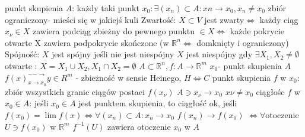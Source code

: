 \documentclass{article}
\begin{document}
punkt skupienia $A$: każdy taki punkt $x_0:\exists (x_n)\subset A:xn\rightarrow x_0, x_n\neq x_0$\newline
zbiór ograniczony- mieści się w jakiejś kuli\newline
Zwartość: $X\subset V$ jest zwarty$\Leftrightarrow$ każdy ciąg $x_\nu\in X$ zawiera podciąg zbieżny do pewnego punktu $\in X
\Leftrightarrow$ każde pokrycie otwarte X zawiera podpokrycie skończone (w $\mathbb{R}^n\Leftrightarrow$ domknięty i ograniczony)\newline
Spójność: $X$ jest spójny jeśli nie jest niespójny\newline
$X$ jest niespójny gdy $\exists X_1, X_2\neq\emptyset$ otwarte : $X=X_1\cup X_2,X_1\cap X_2=\emptyset$\newline
$A\subset \mathbb{R}^n , f:A\rightarrow\mathbb{R}^m$ $x_0$- punkt skupienia $A$ $f(x)^{--\longrightarrow}_{x\rightarrow x_0} y\in R^m$ - zbieżność w sensie Heinego, $H\Leftrightarrow C$\newline
punkt skupienia $f$ w $x_0$: zbiór wszystkich granic ciągów postaci $f(x_\nu)$ $A\ni x_\nu\rightarrow x_0$ $x\nu\neq x_0$\newline
ciągłośc $f$ w $x_0\in A$: jeśli $x_0\in A$ jest punktem skupienia, to ciągłość ok, jeśli $f(x_0)=\lim f(x)\Leftrightarrow\forall(x_n)\subset A: x_n\rightarrow x_0$ $f(x_n)\rightarrow f(x_0)$
$\Leftrightarrow\forall$otoczenie $U\ni f(x_0)$ w $\mathbb{R}^m$ $f^{-1}(U)$ zawiera otoczenie $x_0$ w $A$\newline
\end{document}
